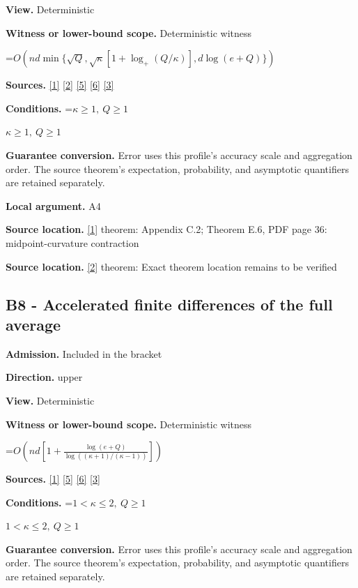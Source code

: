 \documentclass[10pt,a4paper]{article}
\newcommand{\AtlasMath}[1]{\par\begingroup\centering\setbox0=\hbox{$\displaystyle #1$}\ifdim\wd0>1.4\linewidth\typeout{ATLAS WIDE FORMULA: \the\wd0}\fi\ifdim\wd0>\linewidth\resizebox{\linewidth}{!}{\box0}\else\box0\fi\par\endgroup}
\newcommand{\AtlasInlineMath}[1]{\begingroup\setbox0=\hbox{$#1$}\ifdim\wd0>.4\linewidth\endgroup\AtlasMath{#1}\else\endgroup$#1$\fi}
\begin{document}
\textbf{View.} Deterministic

\textbf{Witness or lower-bound scope.} Deterministic witness

\AtlasMath{O(nd\min\{\sqrt Q,\sqrt\kappa[1+\log_+(Q/\kappa)],d\log(e+Q)\})}
\textbf{Sources.} \href{https://arxiv.org/html/2610.00345v1}{[1]} \href{https://arxiv.org/pdf/2609.18728v2}{[2]} \href{https://arxiv.org/html/2607.16558v2}{[5]} \href{https://www.mathnet.ru/php/archive.phtml?jrnid=mzm&option_lang=eng&paperid=1697&wshow=paper}{[6]} \href{https://arxiv.org/abs/2109.08858}{[3]}

\textbf{Conditions.} \AtlasInlineMath{\kappa\ge1,\ Q\ge1}

\textbf{Guarantee conversion.} Error uses this profile's accuracy scale and aggregation order. The source theorem's expectation, probability, and asymptotic quantifiers are retained separately.

\textbf{Local argument.} A4

\textbf{Source location.} \href{https://arxiv.org/html/2610.00345v1}{[1]} theorem: Appendix C.2; Theorem E.6, PDF page 36: midpoint-curvature contraction

\textbf{Source location.} \href{https://arxiv.org/pdf/2609.18728v2}{[2]} theorem: Exact theorem location remains to be verified

\subsection{B8 - Accelerated finite differences of the full average}
\textbf{Admission.} Included in the bracket

\textbf{Direction.} upper

\textbf{View.} Deterministic

\textbf{Witness or lower-bound scope.} Deterministic witness

\AtlasMath{O\!\left(nd\left[1+\frac{\log(e+Q)}{\log((\kappa+1)/(\kappa-1))}\right]\right)}
\textbf{Sources.} \href{https://arxiv.org/html/2610.00345v1}{[1]} \href{https://arxiv.org/html/2607.16558v2}{[5]} \href{https://www.mathnet.ru/php/archive.phtml?jrnid=mzm&option_lang=eng&paperid=1697&wshow=paper}{[6]} \href{https://arxiv.org/abs/2109.08858}{[3]}

\textbf{Conditions.} \AtlasInlineMath{1<\kappa\le2,\ Q\ge1}

\textbf{Guarantee conversion.} Error uses this profile's accuracy scale and aggregation order. The source theorem's expectation, probability, and asymptotic quantifiers are retained separately.
\end{document}
